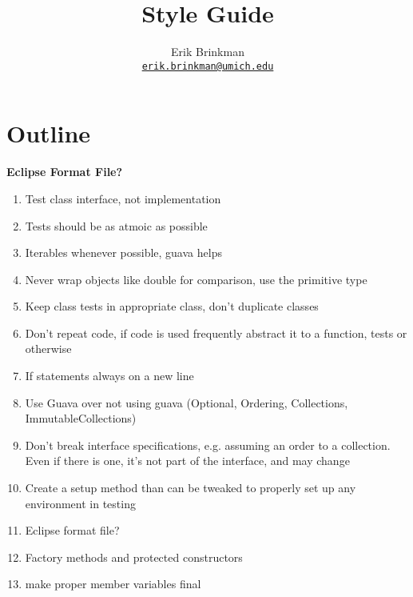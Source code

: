 \documentclass{article}
\newcommand{\email}[1]{\texttt{\href{mailto:#1}{#1}}}
\begin{document}
\title{Style Guide}
\author{Erik Brinkman \\ \email{erik.brinkman@umich.edu}}
\maketitle

\section{Outline}

\textbf{Eclipse Format File?}

\begin{enumerate}
\item Test class interface, not implementation
\item Tests should be as atmoic as possible
\item Iterables whenever possible, guava helps
\item Never wrap objects like double for comparison, use the primitive type
\item Keep class tests in appropriate class, don't duplicate classes
\item Don't repeat code, if code is used frequently abstract it to a function,
  tests or otherwise
\item If statements always on a new line
\item Use Guava over not using guava (Optional, Ordering, Collections,
  ImmutableCollections)
\item Don't break interface specifications, e.g. assuming an order to a
  collection. Even if there is one, it's not part of the interface, and may
  change
\item Create a setup method than can be tweaked to properly set up any
  environment in testing
\item Eclipse format file?
\item Factory methods and protected constructors
\item make proper member variables final
\end{enumerate}
\end{document}
